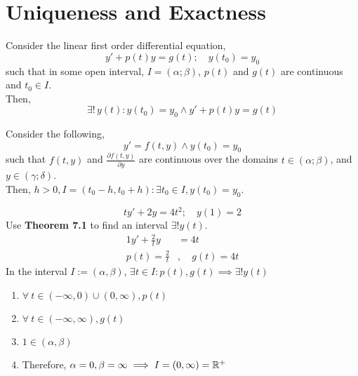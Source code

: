 \documentclass[diffeq.tex]{subfiles}
\begin{document}
    \section{Uniqueness and Exactness}
    \begin{btheorem}
        Consider the linear first order differential equation,
        \begin{equation}
            y' + p(t)y = g(t);\quad y(t_{0}) = y_{0}
        \end{equation}
        such that in some open interval, $I = (\alpha; \beta)$, $p(t)$ and $g(t)$ are continuous and $t_{0} \in I$.\\
        Then,
        \begin{equation}
            \exists!\,y(t): y(t_{0}) = y_{0} \wedge y' + p(t)y = g(t)
        \end{equation}
    \end{btheorem}
    \begin{btheorem}
        Consider the following,
        \begin{equation} 
            y' = f(t, y) \wedge y(t_{0}) = y_{0}
        \end{equation}
        such that $f(t, y)$ and $\frac{\partial f(t, y)}{\partial y}$ are continuous over the domains $t \in (\alpha; \beta)$, and $y \in (\gamma; \delta)$.\\
        Then, $h > 0, I = (t_{0} - h, t_{0} + h): \exists t_{0} \in I, y(t_{0}) = y_{0}$.
    \end{btheorem}
    \begin{example}
        \begin{equation}
            ty' + 2y = 4t^{2};\quad y(1) = 2
        \end{equation}
        Use \textbf{Theorem 7.1} to find an interval $\exists!y(t)$.
        \begin{alignat}{1}
            y' + \frac{2}{t}y &= 4t\\
            p(t) = \frac{2}{t}&,\quad g(t) = 4t
        \end{alignat}
        In the interval $I := (\alpha, \beta)$, $\exists t \in I: p(t), g(t) \implies \exists! y(t)$
        \begin{enumerate}
            \item $\forall\ t \in (-\infty, 0)\cup(0,\infty), p(t)$
            \item $\forall\ t \in (-\infty, \infty), g(t)$
            \item $1 \in (\alpha,\beta)$
            \item Therefore, $\alpha = 0, \beta = \infty \implies I = (0, \infty) = \mathbb{R}^{+}$
        \end{enumerate}
    \end{example}
\end{document}
